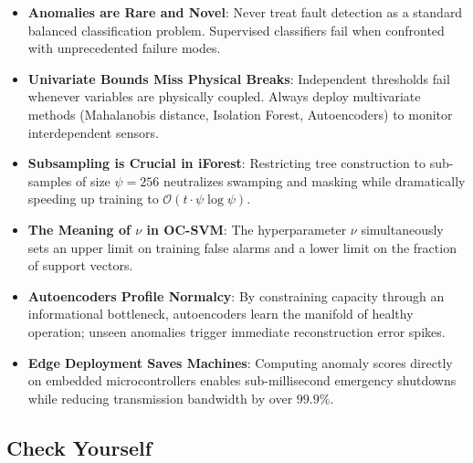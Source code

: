 \begin{takeaways}
\begin{itemize}
    \item \textbf{Anomalies are Rare and Novel}: Never treat fault detection as a standard balanced classification problem. Supervised classifiers fail when confronted with unprecedented failure modes.
    \item \textbf{Univariate Bounds Miss Physical Breaks}: Independent thresholds fail whenever variables are physically coupled. Always deploy multivariate methods (Mahalanobis distance, Isolation Forest, Autoencoders) to monitor interdependent sensors.
    \item \textbf{Subsampling is Crucial in iForest}: Restricting tree construction to sub-samples of size $\psi = 256$ neutralizes swamping and masking while dramatically speeding up training to $\mathcal{O}(t \cdot \psi \log \psi)$.
    \item \textbf{The Meaning of $\nu$ in OC-SVM}: The hyperparameter $\nu$ simultaneously sets an upper limit on training false alarms and a lower limit on the fraction of support vectors.
    \item \textbf{Autoencoders Profile Normalcy}: By constraining capacity through an informational bottleneck, autoencoders learn the manifold of healthy operation; unseen anomalies trigger immediate reconstruction error spikes.
    \item \textbf{Edge Deployment Saves Machines}: Computing anomaly scores directly on embedded microcontrollers enables sub-millisecond emergency shutdowns while reducing transmission bandwidth by over $99.9\%$.
\end{itemize}
\end{takeaways}

\subsection{Check Yourself}\label{subsec:anomaly_check_yourself}

